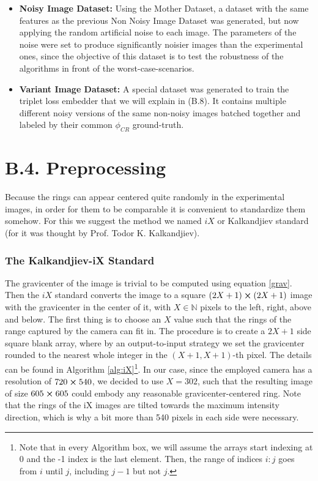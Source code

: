 \documentclass[11pt, a4paper, twoside]{article} %
\newcommand{\N}{\mathbb{N}}
\begin{document}
\begin{itemize}
\item {\bf Noisy Image Dataset:} Using the Mother Dataset, a dataset with the same features as the previous Non Noisy Image Dataset was generated, but now applying the random artificial noise to each image. The parameters of the noise were set to produce significantly noisier images than the experimental ones, since the objective of this dataset is to test the robustness of the algorithms in front of the worst-case-scenarios.

\item {\bf Variant Image Dataset:} A special dataset was generated to train the triplet loss embedder that we will explain in (B.8). It contains multiple different noisy versions of the same non-noisy images batched together and labeled by their common $\phi_{CR}$ ground-truth.
\end{itemize}
\newpage
\section*{B.4. Preprocessing }\vspace{-0.1cm}
Because the rings can appear centered quite randomly in the experimental images, in order for them to be comparable it is convenient to standardize them somehow. For this we suggest the method we named $iX$ or Kalkandjiev standard (for it was thought by Prof. Todor K. Kalkandjiev).\vspace{-0.35cm}
\subsubsection*{The Kalkandjiev-iX Standard\vspace{-0.15cm}}
The gravicenter of the image is trivial to be computed using equation \eqref{grav}. Then the $iX$ standard converts the image to a square $(2X+1)\cross(2X+1)$ image with the gravicenter in the center of it, with $X\in\N$ pixels to the left, right, above and below. The first thing is to choose an $X$ value such that the rings of the range captured by the camera can fit in. The procedure is to create a $2X+1$ side square blank array, where by an output-to-input strategy we set the gravicenter rounded to the nearest whole integer in the $(X+1,X+1)$-th pixel. The details can be found in Algorithm \ref{alg:iX}\footnote{Note that in every Algorithm box, we will assume the arrays start indexing at 0 and the -1 index is the last element. Then, the range of indices $i:j$ goes from $i$ until $j$, including $j-1$ but not $j$.}. In our case, since the employed camera has a resolution of $720\cross 540$, we decided to use $X=302$, such that the resulting image of size $605\cross 605$ could embody any reasonable gravicenter-centered ring. Note that the rings of the iX images are tilted towards the maximum intensity direction, which is why a bit more than 540 pixels in each side were necessary.
\end{document}
